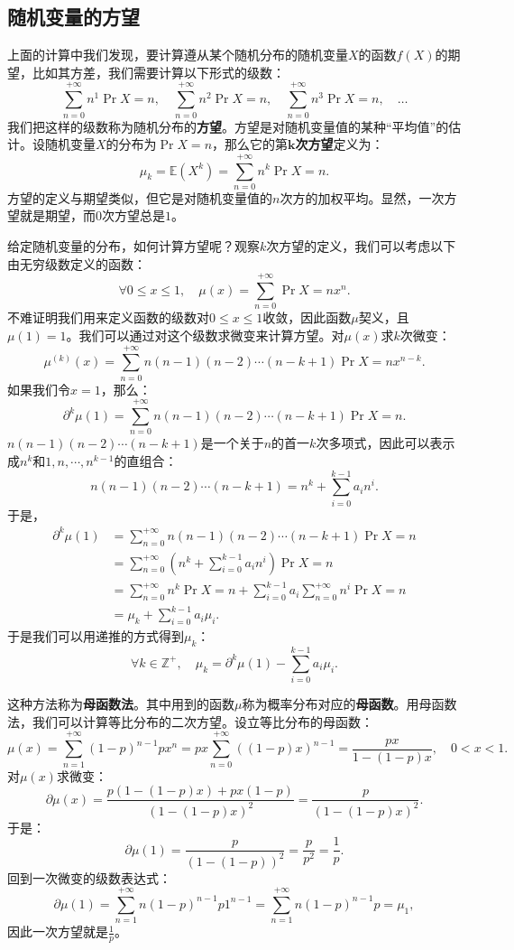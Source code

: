 \documentclass[12pt,UTF8]{ctexbook}
\begin{document}
\subsection{随机变量的方望}
上面的计算中我们发现，要计算遵从某个随机分布的随机变量$X$的函数$f(X)$的期望，比如其方差，我们需要计算以下形式的级数：
\[
    \sum_{n=0}^{+\infty} n^1 \Pr{X=n}, \quad \sum_{n=0}^{+\infty} n^2 \Pr{X=n}, \quad \sum_{n=0}^{+\infty} n^3 \Pr{X=n}, \quad \ldots
\]
我们把这样的级数称为随机分布的\textbf{方望}。方望是对随机变量值的某种“平均值”的估计。设随机变量$X$的分布为$\Pr{X=n}$，那么它的第$\boldsymbol{k}$\textbf{次方望}定义为：
\[
    \mu_k = \mathbb{E}(X^k) = \sum_{n=0}^{+\infty} n^k \Pr{X=n}.
\]
方望的定义与期望类似，但它是对随机变量值的$n$次方的加权平均。显然，一次方望就是期望，而$0$次方望总是$1$。

给定随机变量的分布，如何计算方望呢？观察$k$次方望的定义，我们可以考虑以下由无穷级数定义的函数：
\[
    \forall 0\leqslant x \leqslant 1, \quad \mu(x) = \sum_{n=0}^{+\infty} \Pr{X=n} x^n.
\]
不难证明我们用来定义函数的级数对$0\leqslant x \leqslant 1$收敛，因此函数$\mu$契义，且$\mu(1) = 1$。我们可以通过对这个级数求微变来计算方望。对$\mu(x)$求$k$次微变：
\[
    \mu^{(k)}(x) = \sum_{n=0}^{+\infty} n(n-1)(n-2)\cdots(n-k+1) \Pr{X=n} x^{n-k}.
\]
如果我们令$x=1$，那么： 
\[
    \partial^k \mu(1) = \sum_{n=0}^{+\infty} n(n-1)(n-2)\cdots(n-k+1) \Pr{X=n}.
\]
$n(n-1)(n-2)\cdots(n-k+1)$是一个关于$n$的首一$k$次多项式，因此可以表示成$n^k$和$1,n,\cdots,n^{k-1}$的直组合：
\[
    n(n-1)(n-2)\cdots(n-k+1) = n^k + \sum_{i=0}^{k-1} a_i n^i.
\]
于是，
\begin{align*}
    \partial^k \mu(1) &= \sum_{n=0}^{+\infty} n(n-1)(n-2)\cdots(n-k+1) \Pr{X=n} \\
    &= \sum_{n=0}^{+\infty} \left(n^k + \sum_{i=0}^{k-1} a_i n^i \right) \Pr{X=n} \\
    &= \sum_{n=0}^{+\infty} n^k \Pr{X=n} + \sum_{i=0}^{k-1} a_i \sum_{n=0}^{+\infty} n^i \Pr{X=n} \\
    &= \mu_k + \sum_{i=0}^{k-1} a_i \mu_i.
\end{align*}
于是我们可以用递推的方式得到$\mu_k$：
\[
    \forall k \in \mathbb{Z}^+, \quad \mu_k = \partial^k \mu(1) - \sum_{i=0}^{k-1} a_i \mu_i.
\]

这种方法称为\textbf{母函数法}。其中用到的函数$\mu$称为概率分布对应的\textbf{母函数}。用母函数法，我们可以计算等比分布的二次方望。设立等比分布的母函数：
\[
    \mu(x) = \sum_{n=1}^{+\infty} (1 - p)^{n-1} p x^n = px\sum_{n=0}^{+\infty} ((1 - p)x)^{n-1} = \frac{px}{1 - (1 - p)x}, \quad 0 < x < 1.
\]
对$\mu(x)$求微变：
\[
    \partial \mu(x) = \frac{p(1 - (1 - p)x) + px(1 - p)}{(1 - (1 - p)x)^2} = \frac{p}{(1 - (1 - p)x)^2}.
\]
于是：
$$ \partial \mu(1) = \frac{p}{(1 - (1 - p))^2} = \frac{p}{p^2} = \frac{1}{p}.$$
回到一次微变的级数表达式：
$$ \partial \mu(1) = \sum_{n=1}^{+\infty} n (1 - p)^{n-1} p 1^{n-1} = \sum_{n=1}^{+\infty} n (1 - p)^{n-1} p = \mu_1, $$
因此一次方望就是$\displaystyle \frac{1}{p}$。
\end{document}
